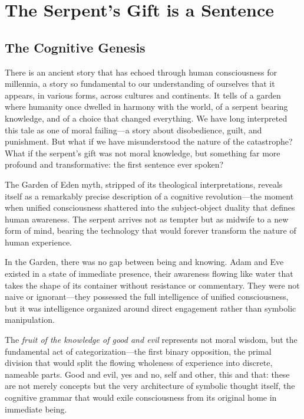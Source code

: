 \chapter{The Serpent's Gift is a Sentence}

\section{The Cognitive Genesis}

There is an ancient story that has echoed through human consciousness for millennia, a story so fundamental to our understanding of ourselves that it appears, in various forms, across cultures and continents. It tells of a garden where humanity once dwelled in harmony with the world, of a serpent bearing knowledge, and of a choice that changed everything. We have long interpreted this tale as one of moral failing—a story about disobedience, guilt, and punishment. But what if we have misunderstood the nature of the catastrophe? What if the serpent's gift was not moral knowledge, but something far more profound and transformative: the first sentence ever spoken?

The Garden of Eden myth, stripped of its theological interpretations, reveals itself as a remarkably precise description of a cognitive revolution—the moment when unified consciousness shattered into the subject-object duality that defines human awareness. The serpent arrives not as tempter but as midwife to a new form of mind, bearing the technology that would forever transform the nature of human experience.

In the Garden, there was no gap between being and knowing. Adam and Eve existed in a state of immediate presence, their awareness flowing like water that takes the shape of its container without resistance or commentary. They were not naive or ignorant—they possessed the full intelligence of unified consciousness, but it was intelligence organized around direct engagement rather than symbolic manipulation.

The \textit{fruit of the knowledge of good and evil} represents not moral wisdom, but the fundamental act of categorization—the first binary opposition, the primal division that would split the flowing wholeness of experience into discrete, nameable parts. Good and evil, yes and no, self and other, this and that: these are not merely concepts but the very architecture of symbolic thought itself, the cognitive grammar that would exile consciousness from its original home in immediate being.

